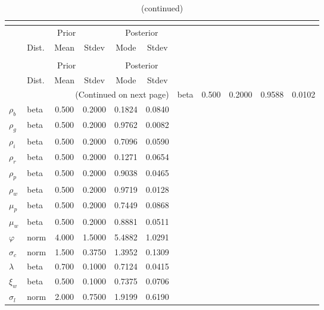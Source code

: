  
\begin{center}
\begin{longtable}{llcccc} 
\caption{Results from posterior maximization (parameters)}\\
 \label{Table:Posterior:1}\\
\toprule 
  & \multicolumn{3}{c}{Prior}  &  \multicolumn{2}{c}{Posterior} \\
  \cmidrule(r{.75em}){2-4} \cmidrule(r{.75em}){5-6}
  & Dist. & Mean  & Stdev & Mode & Stdev \\ 
\midrule \endfirsthead 
\caption{(continued)}\\
 \bottomrule 
  & \multicolumn{3}{c}{Prior}  &  \multicolumn{2}{c}{Posterior} \\
  \cmidrule(r{.75em}){2-4} \cmidrule(r{.75em}){5-6}
  & Dist. & Mean  & Stdev & Mode & Stdev \\ 
\midrule \endhead 
\bottomrule \multicolumn{6}{r}{(Continued on next page)}\endfoot 
\bottomrule\endlastfoot 
${\rho_a}$ & beta &   0.500 & 0.2000 &   0.9588 &  0.0102 \\ 
${\rho_b}$ & beta &   0.500 & 0.2000 &   0.1824 &  0.0840 \\ 
${\rho_g}$ & beta &   0.500 & 0.2000 &   0.9762 &  0.0082 \\ 
${\rho_i}$ & beta &   0.500 & 0.2000 &   0.7096 &  0.0590 \\ 
${\rho_r}$ & beta &   0.500 & 0.2000 &   0.1271 &  0.0654 \\ 
${\rho_p}$ & beta &   0.500 & 0.2000 &   0.9038 &  0.0465 \\ 
${\rho_w}$ & beta &   0.500 & 0.2000 &   0.9719 &  0.0128 \\ 
${\mu_p}$ & beta &   0.500 & 0.2000 &   0.7449 &  0.0868 \\ 
${\mu_w}$ & beta &   0.500 & 0.2000 &   0.8881 &  0.0511 \\ 
${\varphi}$ & norm &   4.000 & 1.5000 &   5.4882 &  1.0291 \\ 
${\sigma_c}$ & norm &   1.500 & 0.3750 &   1.3952 &  0.1309 \\ 
${\lambda}$ & beta &   0.700 & 0.1000 &   0.7124 &  0.0415 \\ 
${\xi_w}$ & beta &   0.500 & 0.1000 &   0.7375 &  0.0706 \\ 
${\sigma_l}$ & norm &   2.000 & 0.7500 &   1.9199 &  0.6190 \\ 

\end{longtable}
\end{center}
